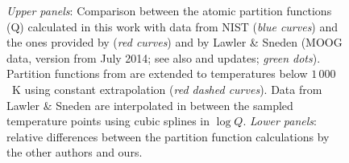 \documentclass[traditabstract]{aa} %
\newcommand{\lawler}{Lawler \& Sneden}
\begin{document}
\begin{figure}[htp]
{}
\caption{\emph{Upper panels}: Comparison between the atomic partition functions (Q) calculated in this work with data from NIST (\emph{blue curves}) and the ones provided by \cite{1987A&A...182..348I} (\emph{red curves}) and by {\lawler} (MOOG data, version from July 2014; see also \citealt{Sneden:1973} and updates; \emph{green dots}). Partition functions from \cite{1987A&A...182..348I} are extended to temperatures below ${1\,000}$~K using  constant extrapolation (\emph{red dashed curves}). Data from {\lawler} are interpolated in between the sampled temperature points using cubic splines in $\log{Q}$. \emph{Lower panels}:  relative differences between the partition function calculations by the other authors and ours. }
\label{fig:atompf}
\end{figure}

\begin{figure}[htp]
\centering
{}
\end{figure}
\end{document}
